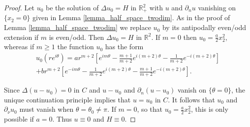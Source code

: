 \documentclass[11pt,a4paper]{amsart}
\theoremstyle{definition}
\numberwithin{equation}{section}
\newcommand{\mR}{\mathbb{R}}                    %
\newcommand{\p}{\partial}
\begin{document}
\begin{proof}
Let $u_0$ be the solution of $\Delta u_0 = H$ in $\mR^2_+$ with $u$ and $\p_n u$ vanishing on $\{ x_2 = 0 \}$ given in Lemma \ref{lemma_half_space_twodim}. As in the proof of Lemma \ref{lemma_half_space_twodim} we replace $u_0$ by its antipodally even/odd extension if $m$ is even/odd. Then $\Delta u_0 = H$ in $\mR^2$. If $m=0$ then $u_0 = \frac{a}{2} x_2^2$, whereas if $m \geq 1$ the function $u_0$ has the form 
\begin{multline*}
u_0(r e^{i\theta}) = a r^{m+2} \left[ e^{im\theta} -\frac{m+1}{m+2} e^{i(m+2)\theta} - \frac{1}{m+2} e^{-i(m+2)\theta} \right] \\
 + b r^{m+2 }\left[ e^{-im\theta} - \frac{1}{m+2} e^{i(m+2)\theta} - \frac{m+1}{m+2} e^{-i(m+2)\theta} \right].
\end{multline*}

Since $\Delta (u-u_0) = 0$ in $C$ and $u-u_0$ and $\p_n(u-u_0)$ vanish on $\{ \theta=0 \}$, the unique continuation principle implies that $u=u_0$ in $C$. It follows that $u_0$ and $\p_{\nu} u_0$ must vanish when $\theta=\theta_0 \neq \pi$. If $m = 0$, so that $u_0 = \frac{a}{2} x_2^2$, this is only possible if $a = 0$. Thus $u \equiv 0$ and $H \equiv 0$.


\end{proof}
\end{document}
